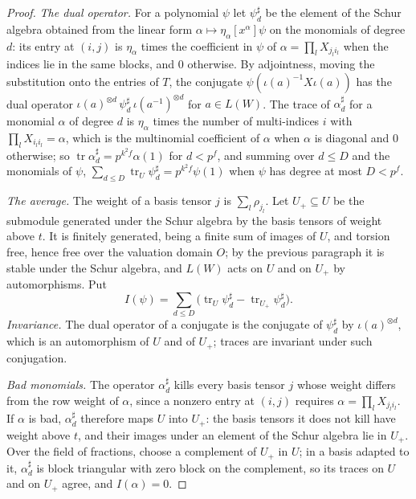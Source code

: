 \begin{proof}
\emph{The dual operator.} For a polynomial $\psi$ let $\psi^\sharp_d$ be the element of the Schur algebra obtained from the linear form $\alpha\mapsto\eta_\alpha[x^\alpha]\psi$ on the monomials of degree $d$: its entry at $(i,j)$ is $\eta_\alpha$ times the coefficient in $\psi$
of $\alpha=\prod_lX_{j_li_l}$ when the indices lie in the same blocks, and $0$ otherwise. By adjointness, moving the substitution onto the entries of $T$, the conjugate $\psi(\iota(a)^{-1}X\iota(a))$ has the dual operator
$\iota(a)^{\otimes d}\,\psi^\sharp_d\,\iota(a^{-1})^{\otimes d}$ for $a\in L(W)$. The trace of $\alpha^\sharp_d$ for a monomial $\alpha$ of degree $d$ is $\eta_\alpha$ times the number of multi-indices $i$ with $\prod_lX_{i_li_l}=\alpha$, which is the multinomial coefficient of
$\alpha$ when $\alpha$ is diagonal and $0$ otherwise; so $\operatorname{tr}\alpha^\sharp_d=p^{k^2f}\alpha(1)$ for $d<p^f$, and summing over $d\le D$ and the monomials of $\psi$, $\sum_{d\le D}\operatorname{tr}_U\psi^\sharp_d=p^{k^2f}\psi(1)$ when $\psi$ has degree at most $D<p^f$.

\emph{The average.} The weight of a basis tensor $j$ is $\sum_l\rho_{j_l}$. Let $U_+\subseteq U$ be the submodule generated under the Schur algebra by the basis tensors of weight above $t$. It is finitely generated, being a finite sum of images of $U$, and torsion
free, hence free over the valuation domain $O$; by the previous paragraph it is stable under the Schur algebra, and $L(W)$ acts on $U$ and on $U_+$ by automorphisms. Put
\[
  I(\psi)=\sum_{d\le D}\bigl(\operatorname{tr}_U\psi^\sharp_d-\operatorname{tr}_{U_+}\psi^\sharp_d\bigr).
\]
\emph{Invariance.} The dual operator of a conjugate is the conjugate of $\psi^\sharp_d$ by $\iota(a)^{\otimes d}$, which is an automorphism of $U$ and of $U_+$; traces are invariant under such conjugation.

\emph{Bad monomials.} The operator $\alpha^\sharp_d$ kills every basis tensor $j$ whose weight differs from the row weight of $\alpha$, since a nonzero entry at $(i,j)$ requires $\alpha=\prod_lX_{j_li_l}$. If $\alpha$ is bad, $\alpha^\sharp_d$ therefore maps $U$ into $U_+$:
the basis tensors it does not kill have weight above $t$, and their images under an element of the Schur algebra lie in $U_+$. Over the field of fractions, choose a complement of $U_+$ in $U$; in a basis adapted to it, $\alpha^\sharp_d$ is block triangular with zero block on the
complement, so its traces on $U$ and on $U_+$ agree, and $I(\alpha)=0$.


\end{proof}
